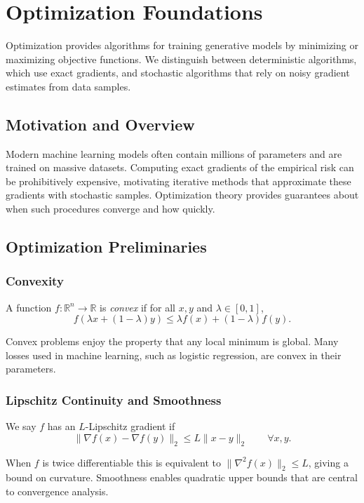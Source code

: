 \chapter{Optimization Foundations}\label{sec:opt}
Optimization provides algorithms for training generative models by minimizing or maximizing objective functions. We distinguish between deterministic algorithms, which use exact gradients, and stochastic algorithms that rely on noisy gradient estimates from data samples.

\section{Motivation and Overview}
Modern machine learning models often contain millions of parameters and are trained on massive datasets. Computing exact gradients of the empirical risk can be prohibitively expensive, motivating iterative methods that approximate these gradients with stochastic samples. Optimization theory provides guarantees about when such procedures converge and how quickly.

\section{Optimization Preliminaries}
\subsection{Convexity}
\begin{definition}
A function $f: \mathbb{R}^n\to\mathbb{R}$ is \emph{convex} if for all $x,y$ and $\lambda\in[0,1]$,
\begin{equation}
f(\lambda x+(1-\lambda)y)\le \lambda f(x)+(1-\lambda)f(y).
\end{equation}
\end{definition}
Convex problems enjoy the property that any local minimum is global. Many losses used in machine learning, such as logistic regression, are convex in their parameters.

\subsection{Lipschitz Continuity and Smoothness}
\begin{definition}
We say $f$ has an $L$-Lipschitz gradient if
\begin{equation}
\|\nabla f(x)-\nabla f(y)\|_2\le L\|x-y\|_2 \qquad \forall x,y.
\end{equation}
\end{definition}
When $f$ is twice differentiable this is equivalent to $\|\nabla^2 f(x)\|_2\le L$, giving a bound on curvature. Smoothness enables quadratic upper bounds that are central to convergence analysis.

